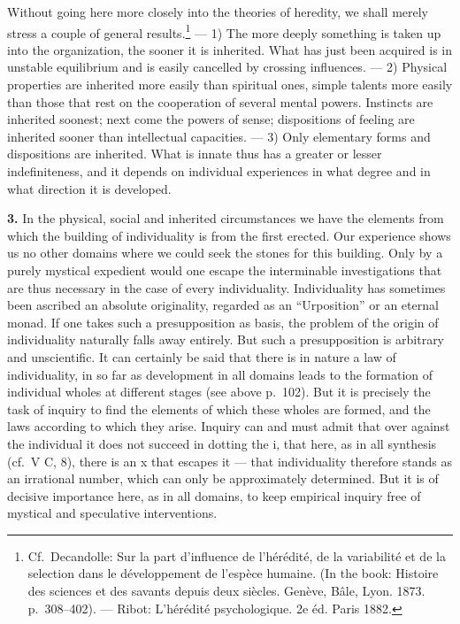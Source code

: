 \documentclass[12pt,a4paper]{book}
\newcommand{\opage}[1]{\marginnote{\footnotesize\textit{[#1]}}}
\begin{document}
Without going here more closely into the theories of heredity, we shall
merely stress a couple of general results.\footnote{Cf.\ Decandolle: Sur
la part d’influence de l’hérédité, de la variabilité et de la selection
dans le développement de l’espèce humaine. (In the book: Histoire des
sciences et des savants depuis deux siècles. Genève, Bâle, Lyon. 1873.
p.~308--402). --- Ribot: L’hérédité psychologique. 2e éd. Paris 1882.}
--- 1) The more deeply something is taken up into the organization, the
sooner it is inherited. What has just been acquired is in unstable
equilibrium and is easily cancelled by crossing influences. --- 2)
Physical properties are inherited more easily than spiritual ones, simple
talents more easily than those that rest on the cooperation of several
mental powers. Instincts are inherited soonest; next come the powers of
sense; dispositions of feeling are inherited sooner than intellectual
capacities. --- 3) Only elementary forms and dispositions are inherited.
What is innate thus has a greater or lesser indefiniteness, and it depends
on individual experiences in what degree and in what direction it is
developed.

\textbf{3.} In the physical, social and inherited circumstances we have
the elements from which the building of individuality is from the first
erected. Our experience shows us no other domains where we could seek the
stones for this building. Only by a purely mystical expedient would one
escape the interminable investigations that are thus necessary in the
case of every individuality. Individuality has sometimes been ascribed an
absolute originality, regarded as an ``Urposition'' or an eternal monad.
If one takes such a presupposition as basis, the problem of the origin of
individuality naturally falls away entirely. But such a presupposition is
arbitrary and unscientific. It can certainly be said that there is in
nature a law of individuality, in so far as development in all domains
leads to the formation of individual wholes at different stages (see
above p.~102). But it is precisely the task of inquiry to find the
elements
\opage{410}of which these wholes are formed, and the laws according to
which they arise. Inquiry can and must admit that over against the
individual it does not succeed in dotting the i, that here, as in all
synthesis (cf.\ V C, 8), there is an x that escapes it --- that
individuality therefore stands as an irrational number, which can only be
approximately determined. But it is of decisive importance here, as in all
domains, to keep empirical inquiry free of mystical and speculative
interventions.
\end{document}
